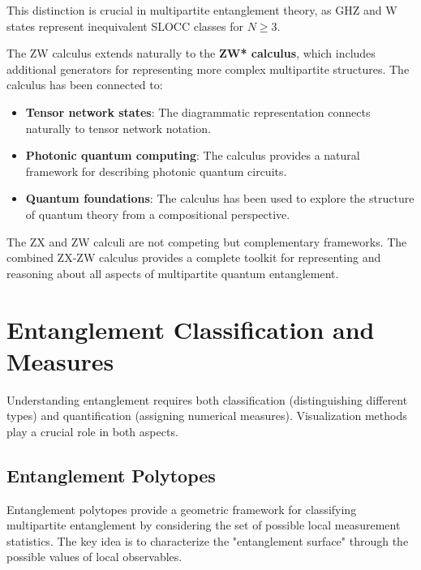 \documentclass[%
 amsmath,amssymb,
 aps,
rmp,
]{revtex4-2}
\begin{document}
This distinction is crucial in multipartite entanglement theory, as GHZ and W states represent inequivalent SLOCC classes for $N \geq 3$.

The ZW calculus extends naturally to the \textbf{ZW* calculus}, which includes additional generators for representing more complex multipartite structures. The calculus has been connected to:
\begin{itemize}
	\item \textbf{Tensor network states}: The diagrammatic representation connects naturally to tensor network notation.
	\item \textbf{Photonic quantum computing}: The calculus provides a natural framework for describing photonic quantum circuits.
	\item \textbf{Quantum foundations}: The calculus has been used to explore the structure of quantum theory from a compositional perspective.
\end{itemize}

The ZX and ZW calculi are not competing but complementary frameworks. The combined ZX-ZW calculus provides a complete toolkit for representing and reasoning about all aspects of multipartite quantum entanglement.








\section{Entanglement Classification and Measures}
\label{sec:classification}

Understanding entanglement requires both classification (distinguishing different types) and quantification (assigning numerical measures). Visualization methods play a crucial role in both aspects.

\subsection{Entanglement Polytopes}
\label{sec:polytopes}

Entanglement polytopes provide a geometric framework for classifying multipartite entanglement by considering the set of possible local measurement statistics. The key idea is to characterize the "entanglement surface" through the possible values of local observables.
\end{document}
